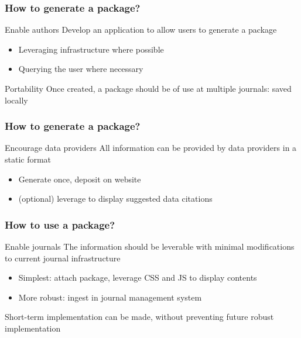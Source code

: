 \begin{frame}
\frametitle{How to generate a \metajelo package?}
\begin{block}{Enable authors}
 Develop an application to allow users to generate a \metajelo package
 \begin{itemize}
 	\item Leveraging infrastructure where possible
 	\item Querying the user where necessary
 \end{itemize}
\end{block}
\begin{block}{Portability}
	Once created, a \metajelo package should be of use at multiple journals: saved locally
\end{block}
\end{frame}

\begin{frame}
\frametitle{How to generate a \metajelo package?}
\begin{block}{Encourage data providers}
	All information can be provided by data providers in a static format
	\begin{itemize}
		\item Generate once, deposit on website
		\item (optional) leverage to display suggested data citations
	\end{itemize}
\end{block}
\end{frame}


\begin{frame}
\frametitle{How to \textbf{use} a \metajelo package?}
\begin{block}{Enable journals}
	The information should be leverable with minimal modifications to current journal infrastructure
	\begin{itemize}
		\item Simplest: attach \metajelo package, leverage CSS and JS to display contents
		\item More robust: ingest in journal management system
	\end{itemize}
Short-term implementation can be made, without preventing future robust implementation
\end{block}
\end{frame}

